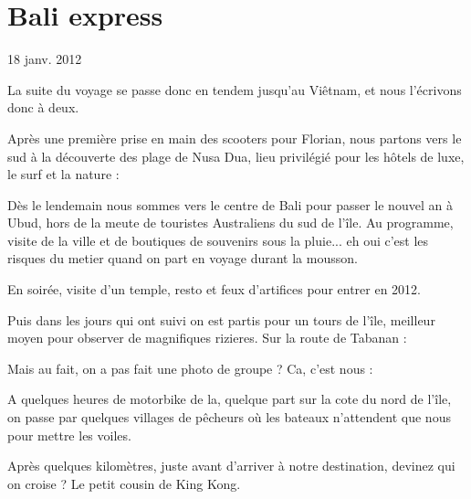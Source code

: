 \section{Bali express}

18 janv. 2012

\begin{multicols}{2}


La suite du voyage se passe donc en tendem jusqu'au Viêtnam, et nous l'écrivons donc à deux.

Après une première prise en main des scooters pour Florian, nous partons vers le sud à la découverte des plage de Nusa Dua, lieu privilégié pour les hôtels de luxe, le surf et la nature :


Dès le lendemain nous sommes vers le centre de Bali pour passer le nouvel an à Ubud, hors de la meute de touristes Australiens du sud de l'île. Au programme, visite de la ville et de boutiques de souvenirs sous la pluie... eh oui c'est les risques du metier quand on part en voyage durant la mousson.


En soirée, visite d'un temple, resto et feux d'artifices pour entrer en 2012.


Puis dans les jours qui ont suivi on est partis pour un tours de l'île, meilleur moyen pour observer de magnifiques rizieres. Sur la route de Tabanan :


Mais au fait, on a pas fait une photo de groupe ? Ca, c'est nous :


A quelques heures de motorbike de la, quelque part sur la cote du nord de l'île, on passe par quelques villages de pêcheurs où les bateaux n'attendent que nous pour mettre les voiles.


Après quelques kilomètres, juste avant d'arriver à notre destination, devinez qui on croise ? Le petit cousin de King Kong.


\end{multicols}
